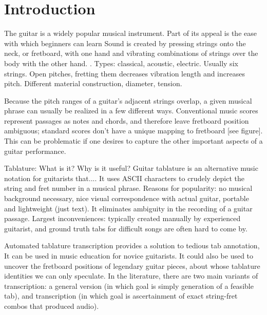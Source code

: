 \documentclass[12pt]{cmuthesis}
\begin{document}
%
%
%
%
%


\chapter{Introduction}
\doublespacing
The guitar is a widely popular musical instrument. Part of its appeal is the ease with which beginners can learn
Sound is created by pressing strings onto the neck, or fretboard, with one hand and vibrating combinations of strings over the body with the other hand. . Types: classical, acoustic, electric. Usually six strings. Open pitches, fretting them decreases vibration length and increases pitch. Different material construction, diameter, tension.

Because the pitch ranges of a guitar's adjacent strings overlap, a given musical phrase can usually be realized in a few different ways. Conventional music scores represent passages as notes and chords, and therefore leave fretboard position ambiguous; standard scores don't have a unique mapping to fretboard [see figure]. This can be problematic if one desires to capture the other important aspects of a guitar performance.

Tablature: What is it? Why is it useful?
Guitar tablature is an alternative music notation for guitarists that.... It uses ASCII characters to crudely depict the string and fret number in a musical phrase. Reasons for popularity: no musical background necessary, nice visual correspondence with actual guitar, portable and lightweight (just text). It eliminates ambiguity in the recording of a guitar passage. Largest inconveniences: typically created manually by experienced guitarist, and ground truth tabs for difficult songs are often hard to come by.

Automated tablature transcription provides a solution to tedious tab annotation, It can be used in music education for novice guitarists. It could also be used to uncover the fretboard positions of legendary guitar pieces, about whose tablature identities we can only speculate. In the literature, there are two main variants of transcription: a general version (in which goal is simply generation of a feasible tab), and transcription (in which goal is ascertainment of exact string-fret combos that produced audio).
\end{document}

